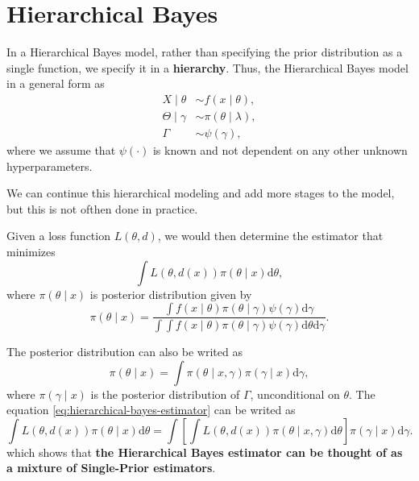 \section{Hierarchical Bayes}

In a Hierarchical Bayes model, rather than specifying the prior distribution as a single function, we specify it in a \textbf{hierarchy}. Thus, the Hierarchical Bayes model in a general form as
\begin{equation}
    \begin{aligned}
        X\mid\theta      & \sim f\left(x\mid\theta\right),         \\
        \Theta\mid\gamma & \sim \pi\left(\theta\mid\lambda\right), \\
        \Gamma           & \sim \psi\left(\gamma\right),
    \end{aligned}
    \label{eq:hierarchical-bayes}
\end{equation}
where we assume that $\psi\left(\cdot\right)$ is known and not dependent on any other unknown hyperparameters.

\begin{note}
    We can continue this hierarchical modeling and add more stages to the model, but this is not ofthen done in practice.
\end{note}

Given a loss function $L\left(\theta,d\right)$, we would then determine the estimator that minimizes
\begin{equation} \label{eq:hierarchical-bayes-estimator}
    \int L\left(\theta,d\left(x\right)\right)\pi\left(\theta\mid x\right)\mathrm{d}\theta,
\end{equation}
where $\pi\left(\theta\mid x\right)$ is posterior distribution given by
\begin{equation*}
    \pi\left(\theta\mid x\right)=\frac{\int f\left(x\mid\theta\right)\pi\left(\theta\mid\gamma\right)\psi\left(\gamma\right)\mathrm{d}\gamma}{\int\int f\left(x\mid\theta\right)\pi\left(\theta\mid\gamma\right)\psi\left(\gamma\right)\mathrm{d}\theta\mathrm{d}\gamma}.
\end{equation*}

\begin{note}
    The posterior distribution can also be writed as
    \begin{equation*}
        \pi\left(\theta\mid x\right)=\int\pi\left(\theta\mid x,\gamma\right)\pi\left(\gamma\mid x\right)\mathrm{d}\gamma,
    \end{equation*}
    where $\pi\left(\gamma\mid x\right)$ is the posterior distribution of $\Gamma$, unconditional on $\theta$. The equation \ref{eq:hierarchical-bayes-estimator} can be writed as
    \begin{equation*}
        \int L\left(\theta,d\left(x\right)\right)\pi\left(\theta\mid x\right)\mathrm{d}\theta = \int\left[\int L\left(\theta,d\left(x\right)\right)\pi\left(\theta\mid x,\gamma\right)\mathrm{d}\theta\right]\pi\left(\gamma\mid x\right)\mathrm{d}\gamma.
    \end{equation*}
    which shows that \textbf{the Hierarchical Bayes estimator can be thought of as a mixture of Single-Prior estimators}.
\end{note}


